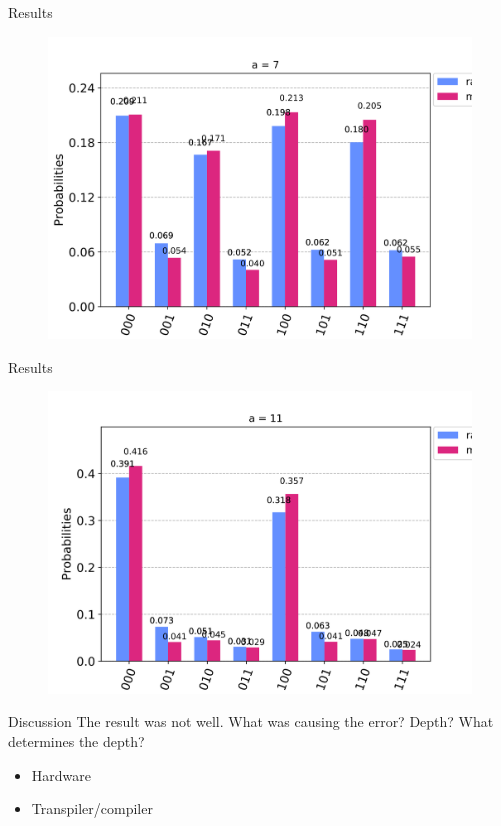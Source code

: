 \documentclass{beamer}
\begin{document}
\begin{frame}{Results}
	\begin{figure}[h]
		\centering
		\includegraphics[width=0.8\linewidth]{./figs/error_mitigation_7_cambridge_2.png}
	\end{figure}
\end{frame}

\begin{frame}{Results}
	\begin{figure}[h]
		\centering
		\includegraphics[width=0.8\linewidth]{./figs/error_mitigation_11_cambridge_2.png}
	\end{figure}
\end{frame}

\begin{frame}{Discussion}
	The result was not well. What was causing the error? Depth?
	What determines the depth?
	\begin{itemize}
		\item Hardware
		\item Transpiler/compiler
	\end{itemize}
\end{frame}
\end{document}
